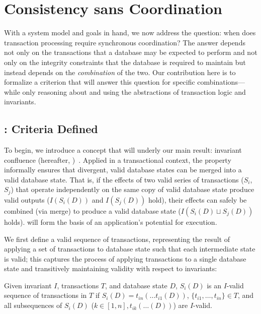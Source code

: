 
\section{Consistency sans Coordination}
\label{sec:bcc-theory}

With a system model and goals in hand, we now address the question:
when does transaction processing require synchronous coordination? The
answer depends not only on the transactions that a database may be
expected to perform and not only on the integrity constraints that the
database is required to maintain but instead depends on the
\textit{combination} of the two. Our contribution here is to formalize
a criterion that will answer this question for specific
combinations---while only reasoning about and using the abstractions
of transaction logic and invariants.

\subsection{\iconfluence: Criteria Defined}

To begin, we introduce a concept that will underly our main result:
invariant confluence (hereafter,
\iconfluence)~\cite{obs-confluence}. Applied in a transactional
context, the \iconfluence property informally ensures that divergent,
valid database states can be merged into a valid database state. That
is, if the effects of two valid series of transactions ($S_i$, $S_j$)
that operate independently on the same copy of valid database state
produce valid outputs ($I(S_i(D))$ and $I(S_j(D))$ hold), their
effects can safely be combined (via merge) to produce a valid database
state ($I(S_i(D) \sqcup S_j(D))$ holds). \iconfluence will form the
basis of an application's potential for \cfree execution.

We first define a valid sequence of transactions, representing the
result of applying a set of transactions to database state such that
each intermediate state is valid; this captures the process of
applying transactions to a single database state and transitively
maintaining validity with respect to invariants:

\begin{definition}
Given invariant $I$, transactions $T$, and database state $D$,
$S_i(D)$ is an $I$-valid sequence of transactions in $T$ if $S_i(D) =
t_{in}(\dots t_{i1}(D))$, $\{t_{i1}, \dots, t_{in}\} \in T$, and all
subsequences of $S_i(D)$ ($k \in [1, n], t_{ik}(\dots (D))$) are
$I$-valid.
\end{definition}

